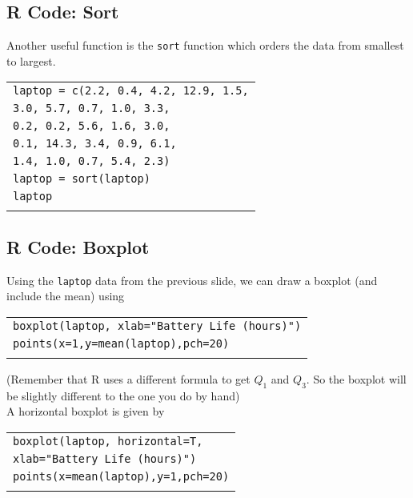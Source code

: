 \subsection{R Code: Sort}
\begin{frame}{\bf {}}
Another useful function is the \texttt{sort} function which orders the data from smallest to largest.\\[0.3cm]

\begin{tabular}{|l|}
\hline
\texttt{laptop = c(2.2, 0.4,  4.2, 12.9,  1.5,}\\
\hspace{2.5cm}\texttt{3.0,  5.7,  0.7,  1.0,  3.3,}\\
\hspace{2.5cm}\texttt{0.2,  0.2,  5.6,  1.6,  3.0,}\\
\hspace{2.5cm}\texttt{0.1, 14.3,  3.4,  0.9,  6.1,}\\
\hspace{2.5cm}\texttt{1.4,  1.0,  0.7,  5.4,  2.3)}\\
\texttt{laptop = sort(laptop)}\\
\texttt{laptop}\\
\hline
\multicolumn{1}{c}{}\\[-0.1cm]
\end{tabular}

\end{frame}



\subsection{R Code: Boxplot}
\begin{frame}{\bf {}}
Using the \texttt{laptop} data from the previous slide, we can draw a boxplot (and include the mean) using\\[0.3cm]
\begin{tabular}{|l|}
\hline
\texttt{boxplot(laptop, xlab="Battery Life (hours)")}\\
\texttt{points(x=1,y=mean(laptop),pch=20)}\\
\hline
\multicolumn{1}{c}{}\\[-0.3cm]
\end{tabular}

{\footnotesize(Remember that R uses a different formula to get $Q_1$ and $Q_3$. So the boxplot will be slightly different to the one you do by hand)}\\[0.7cm]


A horizontal boxplot is given by\\[0.3cm]
\begin{tabular}{|l|}
\hline
\texttt{boxplot(laptop, horizontal=T, }\\
\hspace{2cm}\texttt{xlab="Battery Life (hours)")}\\
\texttt{points(x=mean(laptop),y=1,pch=20)}\\
\hline
\multicolumn{1}{c}{}\\[-0.1cm]
\end{tabular}
\end{frame}


